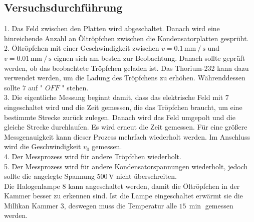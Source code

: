 \subsection{Versuchsdurchführung}
1. Das Feld zwischen den Platten wird abgeschaltet. Danach wird eine hinreichende Anzahl an Öltröpfchen zwischen die Kondensatorplatten gesprüht. \\

2. Öltröpfchen mit einer Geschwindigkeit zwischen $v = 0.1 \, \unit{\milli\meter} \mathbin{/} \unit{\second}$ und $v = 0.01 \, \unit{\milli\meter} \mathbin{/} \unit{\second}$ eignen sich am besten zur Beobachtung.
Danach sollte geprüft werden, ob das beobachtete Tröpfchen geladen ist. Das Thorium-232 kann dazu verwendet werden, um die Ladung des Tröpfchens zu erhöhen. Währenddessen sollte $7$ auf " $OFF$ " stehen. \\

3. Die eigentliche Messung beginnt damit, dass das elektrische Feld mit $7$ eingeschaltet wird und die Zeit gemessen, die das Tröpfchen braucht, um eine bestimmte Strecke zurück zulegen.
Danach wird das Feld umgepolt und die gleiche Strecke durchlaufen. Es wird erneut die Zeit gemessen. Für eine größere Messgenauigkeit kann dieser Prozess mehrfach wiederholt werden.
Im Anschluss wird die Geschwindigkeit $v_0$ gemessen. \\

4. Der Messprozess wird für andere Tröpfchen wiederholt.\\

5. Der Messprozess wird für andere Kondensatorspannungen wiederholt, jedoch sollte die angelegte Spannung $500 \, \unit{\volt}$ nicht überschreiten.\\

Die Halogenlampe $8$ kann angeschaltet werden, damit die Öltröpfchen in der Kammer besser zu erkennen sind.
Ist die Lampe eingeschaltet erwärmt sie die Millikan Kammer $3$, deswegen muss die Temperatur alle $15 \, \unit{\min}$ gemessen werden.
